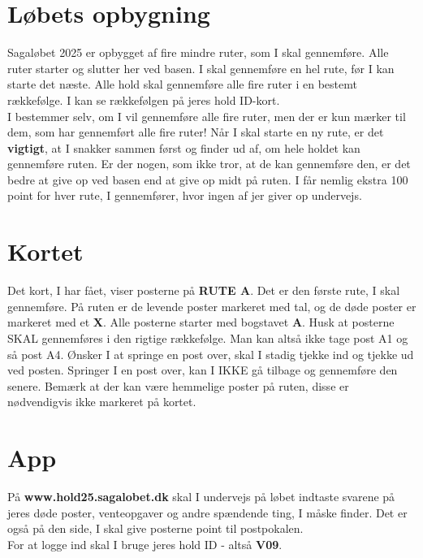 \section{Løbets opbygning}
Sagaløbet 2025 er opbygget af fire mindre ruter, som I skal gennemføre. Alle ruter starter og slutter her ved basen. I skal gennemføre en hel rute, før I kan starte det næste. Alle hold skal gennemføre alle fire ruter i en bestemt rækkefølge. I kan se rækkefølgen på jeres hold ID-kort.\\\newline
I bestemmer selv, om I vil gennemføre alle fire ruter, men der er kun mærker til dem, som har gennemført alle fire ruter! Når I skal starte en ny rute, er det \textbf{vigtigt}, at I snakker sammen først og finder ud af, om hele holdet kan gennemføre ruten. Er der nogen, som ikke tror, at de kan gennemføre den, er det bedre at give op ved basen end at give op midt på ruten. I får nemlig ekstra 100 point for hver rute, I gennemfører, hvor ingen af jer giver op undervejs.\\
\section{Kortet}
Det kort, I har fået, viser posterne på \textbf{RUTE A}. Det er den første rute, I skal gennemføre. På ruten er de levende poster markeret med tal, og de døde poster er markeret med et \textbf{X}. Alle posterne starter med bogstavet \textbf{A}. Husk at posterne SKAL gennemføres i den rigtige rækkefølge. Man kan altså ikke tage post A1 og så post A4. Ønsker I at springe en post over, skal I stadig tjekke ind og tjekke ud ved posten. Springer I en post over, kan I IKKE gå tilbage og gennemføre den senere. Bemærk at der kan være hemmelige poster på ruten, disse er nødvendigvis ikke markeret på kortet.
\section{App}
På \textbf{www.hold25.sagalobet.dk} skal I undervejs på løbet indtaste svarene på jeres døde poster, venteopgaver og andre spændende ting, I måske finder. Det er også på den side, I skal give posterne point til postpokalen.\\
For at logge ind skal I bruge jeres hold ID - altså \textbf{V09}.
\newpage
